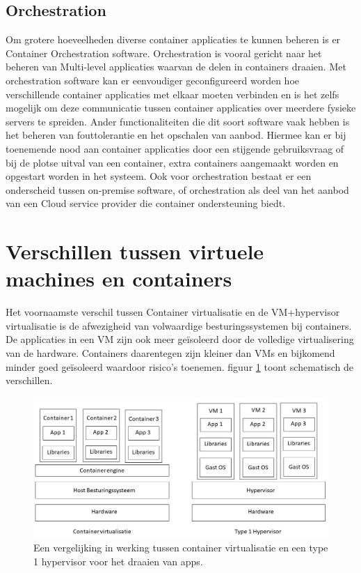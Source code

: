 \subsection{Orchestration}
Om grotere hoeveelheden diverse container applicaties te kunnen beheren is er Container Orchestration software. Orchestration is vooral gericht naar het beheren van Multi-level applicaties waarvan de delen in containers draaien. Met orchestration software kan er eenvoudiger geconfigureerd worden hoe verschillende container applicaties met elkaar moeten verbinden en is het zelfs mogelijk om deze communicatie tussen container applicaties over meerdere fysieke servers te spreiden. Ander functionaliteiten die dit soort software vaak hebben is het beheren van fouttolerantie en het opschalen van aanbod. Hiermee kan er bij toenemende nood aan container applicaties door een stijgende gebruiksvraag of bij de plotse uitval van een container, extra containers aangemaakt worden en opgestart worden in het systeem. Ook voor orchestration bestaat er een onderscheid tussen on-premise software, of orchestration als deel van het aanbod van een Cloud service provider die container ondersteuning biedt\autocite{Casalicchio2020,Truyen2019}.


\section{Verschillen tussen virtuele machines en containers}
Het voornaamste verschil tussen Container virtualisatie en de VM+hypervisor virtualisatie is de afwezigheid van volwaardige besturingssystemen bij containers. De applicaties in een VM zijn ook meer geïsoleerd door de volledige virtualisering van de hardware. Containers daarentegen zijn kleiner dan VMs en bijkomend minder goed geïsoleerd waardoor risico’s toenemen. figuur \ref{fig:containerVShypervisor} toont schematisch de verschillen.

\begin{figure}[h]
    \includegraphics[width=\linewidth]{img/containerVShyper.jpg}
    \caption[Vergelijking container virtualisatie en type 1 hypervisor]{Een vergelijking in werking tussen container virtualisatie en een type 1 hypervisor voor het draaien van apps.}
    \label{fig:containerVShypervisor}
    \centering
\end{figure}

